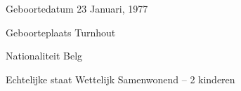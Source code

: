 


\begin{cvskills}


\cvskill
{Geboortedatum} %
{23 Januari, 1977} %


\cvskill
{Geboorteplaats} %
{Turnhout} %


\cvskill
{Nationaliteit} %
{Belg} %


\cvskill
{Echtelĳke staat} %
{Wettelijk Samenwonend – 2 kinderen} %

\end{cvskills}